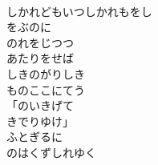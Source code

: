 \documentclass[10pt,b5j]{tarticle} %
\begin{document}
\begin{enumerate}
\begin{minipage}[c]{\blocksize}
        \vspace{\linespace}
        \item[ ]~\\
        しかれどもいつしかれもをし\\
        をぶのに\\
        のれをじつつ\\
        あたりをせば\\
        しきのがりしき\\
        ものここにてう\\
        「のいきげて\\
        きでりゆけ」\\
        ふとぎるに\\
        のはくずしれゆく
    
    \end{minipage}
\end{enumerate} %
\end{document}
